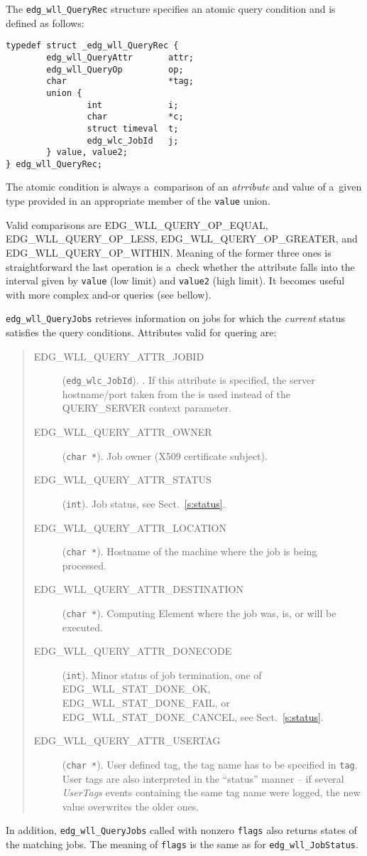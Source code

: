 \documentclass{egee}
\begin{document}
The \verb'edg_wll_QueryRec' structure specifies an atomic query condition 
and is defined as follows:

\begin{verbatim}
typedef struct _edg_wll_QueryRec {
        edg_wll_QueryAttr       attr;   
        edg_wll_QueryOp         op;    
        char                    *tag;  
        union {
                int             i;      
                char            *c;    
                struct timeval  t;    
                edg_wlc_JobId   j;
        } value, value2;
} edg_wll_QueryRec;
\end{verbatim}

The atomic condition is always a~comparison of an \emph{atrribute}
and value of a~given type provided in an appropriate member of the
\verb'value' union. 

Valid comparisons are 
EDG\_WLL\_QUERY\_OP\_EQUAL,
EDG\_WLL\_QUERY\_OP\_LESS,
EDG\_WLL\_QUERY\_OP\_GREATER,
and EDG\_WLL\_QUERY\_OP\_WITHIN.
Meaning of the former three ones is straightforward
the last operation is a~check whether the attribute falls
into the interval given by \verb'value' (low limit) and \verb'value2'
(high limit). 
It becomes useful with more complex and-or queries (see bellow).

\def\qitem[#1]{\item[\normalfont EDG\_WLL\_QUERY\_ATTR\_#1]}

\verb'edg_wll_QueryJobs' retrieves information on jobs for which the
\emph{current} status satisfies the query conditions.
Attributes valid for quering are:
\begin{quote}
\begin{description}
\qitem[JOBID] (\verb'edg_wlc_JobId'). \jobid.
If this attribute is specified, the server hostname/port taken from
the \jobid is used instead of the QUERY\_SERVER context parameter.
\qitem[OWNER] (\verb'char *'). Job owner (X509 certificate subject).
\qitem[STATUS] (\verb'int'). Job status, see Sect.~\ref{s:status}.
\qitem[LOCATION] (\verb'char *'). Hostname of the machine where the job is 
being processed.
\qitem[DESTINATION] (\verb'char *'). Computing Element where the job was, is, or will be executed.
\qitem[DONECODE] (\verb'int'). Minor status of job termination, 
one of EDG\_WLL\_STAT\_DONE\_OK, EDG\_WLL\_STAT\_DONE\_FAIL, or EDG\_WLL\_STAT\_DONE\_CANCEL, see Sect.~\ref{s:status}.
\qitem[USERTAG] (\verb'char *').
User defined tag, the tag name has to be specified in \verb'tag'.
User tags are also interpreted in the ``status'' manner --
if several \emph{UserTags} events containing the same tag name were logged,
the new value overwrites the older ones.
\end{description}
\end{quote}
In addition, \verb'edg_wll_QueryJobs' called with nonzero \verb'flags'
also returns states of the matching jobs. 
The meaning of \verb'flags' is the same as for \verb'edg_wll_JobStatus'.
\end{document}
